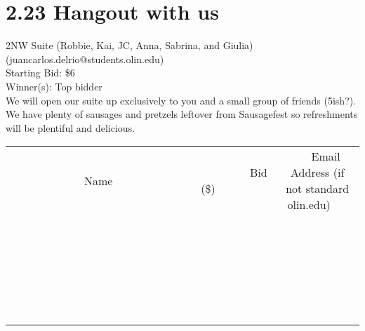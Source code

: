 \documentclass[11pt]{article}
\begin{document}
\section*{2.23 Hangout with us}
2NW Suite (Robbie, Kai, JC, Anna, Sabrina, and Giulia) (juancarlos.delrio@students.olin.edu) \\
Starting Bid: \$6 \\
Winner(s): 
Top bidder \\
We will open our suite up exclusively to you and a small group of friends (5ish?). We have plenty of sausages and pretzels leftover from Sausagefest so refreshments will be plentiful and delicious. \\[6ex]
\begin{tabular}{c c c}
~~~~~~~~~~~~~Name~~~~~~~~~~~~~ & ~~~~~~~~~Bid (\$)~~~~~~~~~ & ~~~Email Address (if not standard olin.edu)~~~ \\
 & & \\
\hline
 & & \\
\hline
 & & \\
\hline
 & & \\
\hline
 & & \\
\hline
 & & \\
\hline
 & & \\
\hline
 & & \\
\hline
 & & \\
\hline
 & & \\
\hline
 & & \\
\hline
 & & \\
\hline
 & & \\
\hline
 & & \\
\hline
 & & \\
\hline
 & & \\
\hline
 & & \\
\hline
 & & \\
\hline
 & & \\
\hline
 & & \\
\hline
 & & \\
\hline
 & & \\
\hline
 & & \\
\hline
 & & \\
\hline
 & & \\
\hline
 & & \\
\hline
\end{tabular}
\clearpage
\end{document}

